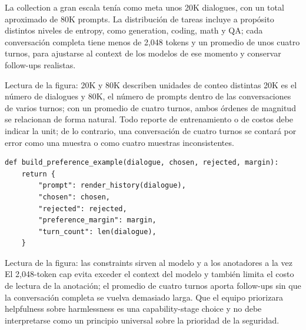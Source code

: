La collection a gran escala tenía como meta unos 20K dialogues, con un total aproximado de 80K prompts. La distribución de tareas incluye a propósito distintos niveles de entropy, como generation, coding, math y QA; cada conversación completa tiene menos de 2,048 tokens y un promedio de unos cuatro turnos, para ajustarse al context de los modelos de ese momento y conservar follow-ups realistas.


\begin{knowledgebox}{Lectura de la figura: 20K y 80K describen unidades de conteo distintas}
20K es el número de dialogues y 80K, el número de prompts dentro de las conversaciones de varios turnos; con un promedio de cuatro turnos, ambos órdenes de magnitud se relacionan de forma natural. Todo reporte de entrenamiento o de costos debe indicar la unit; de lo contrario, una conversación de cuatro turnos se contará por error como una muestra o como cuatro muestras inconsistentes.
\end{knowledgebox}


\begin{lstlisting}[caption={Estructura conceptual para convertir una multi-turn chosen/rejected conversation en un lote de DPO}]
def build_preference_example(dialogue, chosen, rejected, margin):
    return {
        "prompt": render_history(dialogue),
        "chosen": chosen,
        "rejected": rejected,
        "preference_margin": margin,
        "turn_count": len(dialogue),
    }
\end{lstlisting}


\begin{knowledgebox}{Lectura de la figura: las constraints sirven al modelo y a los anotadores a la vez}
El 2,048-token cap evita exceder el context del modelo y también limita el costo de lectura de la anotación; el promedio de cuatro turnos aporta follow-ups sin que la conversación completa se vuelva demasiado larga. Que el equipo priorizara helpfulness sobre harmlessness es una capability-stage choice y no debe interpretarse como un principio universal sobre la prioridad de la seguridad.
\end{knowledgebox}

